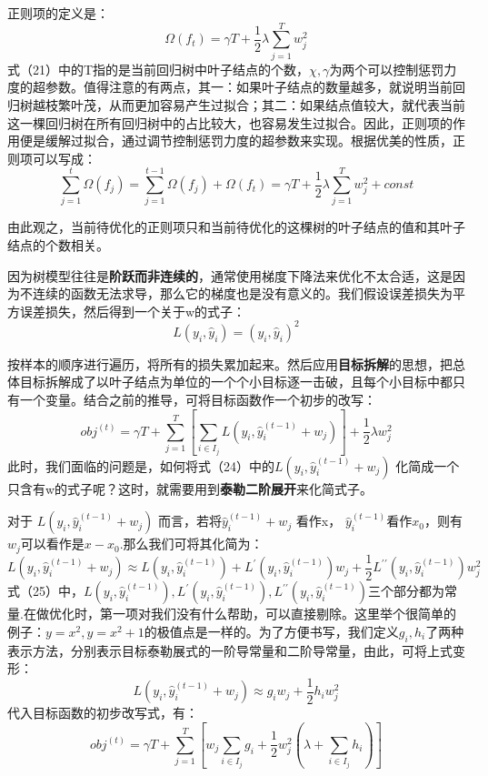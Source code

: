 正则项的定义是：
\begin{equation}\Omega(f_t)=\gamma T+\frac12\lambda\sum_{j=1}^Tw_j^2\end{equation}
式（21）中的T指的是当前回归树中叶子结点的个数，$\chi,\gamma $为两个可以控制惩罚力度的超参数。值得注意的有两点，其一：如果叶子结点的数量越多，就说明当前回归树越枝繁叶茂，从而更加容易产生过拟合；其二：如果结点值较大，就代表当前这一棵回归树在所有回归树中的占比较大，也容易发生过拟合。因此，正则项的作用便是缓解过拟合，通过调节控制惩罚力度的超参数来实现。根据优美的性质，正则项可以写成：
\begin{equation}\sum_{j=1}^t\Omega(f_j)=\sum_{j=1}^{t-1}\Omega(f_j)+\Omega(f_t)=\gamma T+\frac12\lambda\sum_{j=1}^Tw_j^2+const\end{equation}

由此观之，当前待优化的正则项只和当前待优化的这棵树的叶子结点的值和其叶子结点的个数相关。

因为树模型往往是\textbf{阶跃而非连续的}，通常使用梯度下降法来优化不太合适，这是因为不连续的函数无法求导，那么它的梯度也是没有意义的。我们假设误差损失为平方误差损失，然后得到一个关于w的式子：
\begin{equation}L(y_i,\hat{y}_i)=(y_i,\hat{y}_i)^2\end{equation}

按样本的顺序进行遍历，将所有的损失累加起来。然后应用\textbf{目标拆解}的思想，把总体目标拆解成了以叶子结点为单位的一个个小目标逐一击破，且每个小目标中都只有一个变量。结合之前的推导，可将目标函数作一个初步的改写：
\begin{equation}obj^{(t)}=\gamma T+\sum_{j=1}^T\left[\sum_{i\in I_j}L(y_i,\hat{y}_i^{(t-1)}+w_j)\right]+\frac12\lambda w_j^2\end{equation}
此时，我们面临的问题是，如何将式（24）中的$L(y_i,\hat{y}_i^{(t-1)}+w_j)$            化简成一个只含有w的式子呢？这时，就需要用到\textbf{泰勒二阶展开}来化简式子。

对于 $L(y_i,\hat{y}_i^{(t-1)}+w_j)$ 而言，若将$\hat{y}_{i}^{(t-1)}+w_{j}$        看作x，    $\hat{y}_i^{(t-1)}$看作$x_{0}$，则有  $w_{j}$可以看作是$x-x_{0}$.那么我们可将其化简为：
\begin{equation}L(y_i,\hat{y}_i^{(t-1)}+w_j)\approx L(y_i,\hat{y}_i^{(t-1)})+L^{\prime}(y_i,\hat{y}_i^{(t-1)})w_j+\frac12L^{\prime\prime}(y_i,\hat{y}_i^{(t-1)})w_j^2\end{equation}
式（25）中，$L(y_i,\hat{y}_i^{(t-1)}) ,L^{\prime}(y_i,\hat{y}_i^{(t-1)}) ,L^{\prime\prime}(y_i,\hat{y}_i^{(t-1)})$三个部分都为常量.在做优化时，第一项对我们没有什么帮助，可以直接剔除。这里举个很简单的例子：$y=x^2, y=x^2+1$的极值点是一样的。为了方便书写，我们定义$g_i,h_i$了两种表示方法，分别表示目标泰勒展式的一阶导常量和二阶导常量，由此，可将上式变形：
\begin{equation}L(y_i,\hat{y}_i^{(t-1)}+w_j)\approx g_iw_j+\frac12h_iw_j^2\end{equation}
代入目标函数的初步改写式，有：
\begin{equation}obj^{(t)}=\gamma T+\sum_{j=1}^T[w_j\sum_{i\in I_j}g_i+\frac12w_j^2(\lambda+\sum_{i\in I_j}h_i)]\end{equation}

